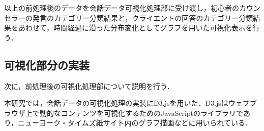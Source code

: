 \documentclass[shuuron]{kuee}
\begin{document}

以上の前処理後のデータを会話データ可視化処理部に受け渡し，初心者のカウンセラーの発言のカテゴリー分類結果と，クライエントの回答のカテゴリー分類結果をあわせて，時間経過に沿った分布変化としてグラフを用いた可視化表示を行う．















\subsection{可視化部分の実装} %

次に，前処理後の可視化処理部について説明を行う．





本研究では，会話データの可視化処理の実装にD3.js\cite{vand3}を用いた．D3.jsはウェブブラウザ上で動的なコンテンツを可視化するためのJavaScriptのライブラリであり，ニューヨーク・タイムズ紙サイト内のグラフ描画などに用いられている．
\end{document}
